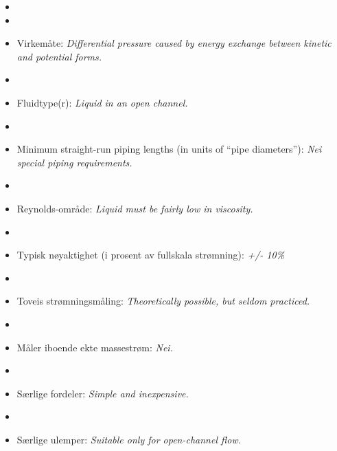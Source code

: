 \begin{itemize}
\goodbreak
\item{} 
\vskip 5pt
\item\item{} Virkemåte: {\it Differential pressure caused by energy exchange between kinetic and potential forms.}
\vskip 5pt
\item\item{} Fluidtype(r): {\it Liquid in an open channel.}
\vskip 5pt
\item\item{} Minimum straight-run piping lengths (in units of ``pipe diameters''): {\it Nei special piping requirements.}
\vskip 5pt
\item\item{} Reynolds-område: {\it Liquid must be fairly low in viscosity.}
\vskip 5pt
\item\item{} Typisk nøyaktighet (i prosent av fullskala strømning): {\it +/- 10\%}
\vskip 5pt
\item\item{} Toveis strømningsmåling: {\it Theoretically possible, but seldom practiced.}
\vskip 5pt
\item\item{} Måler iboende ekte massestrøm: {\it Nei.}
\vskip 5pt
\item\item{} Særlige fordeler: {\it Simple and inexpensive.}
\vskip 5pt
\item\item{} Særlige ulemper: {\it Suitable only for open-channel flow.}
\end{itemize}

